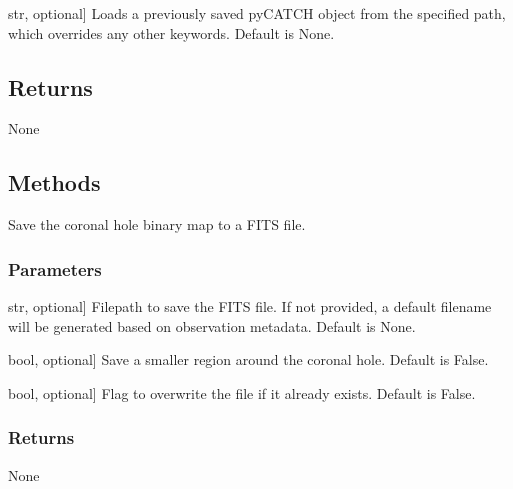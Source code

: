 \documentclass[letterpaper,10pt,english]{sphinxmanual}
\begin{document}
\begin{fulllineitems}
\begin{description}
\sphinxlineitem{load}{[}str, optional{]}
\sphinxAtStartPar
Loads a previously saved pyCATCH object from the specified path, which overrides any other keywords. Default is None.

\end{description}


\subsection{Returns}
\label{\detokenize{pycatch/pycatch:returns}}
\sphinxAtStartPar
None


\subsection{Methods}
\label{\detokenize{pycatch/pycatch:methods}}

\begin{fulllineitems}
\label{\detokenize{pycatch/pycatch:pycatch.pycatch.pycatch.bin2fits}}
\pysigstartsignatures
{}
\pysigstopsignatures
\sphinxAtStartPar
Save the coronal hole binary map to a FITS file.


\subsubsection{Parameters}
\label{\detokenize{pycatch/pycatch:id1}}\begin{description}
\sphinxlineitem{file}{[}str, optional{]}
\sphinxAtStartPar
Filepath to save the FITS file. If not provided, a default filename will be generated based on observation metadata. Default is None.

\sphinxlineitem{small}{[}bool, optional{]}
\sphinxAtStartPar
Save a smaller region around the coronal hole. Default is False.

\sphinxlineitem{overwrite}{[}bool, optional{]}
\sphinxAtStartPar
Flag to overwrite the file if it already exists. Default is False.

\end{description}


\subsubsection{Returns}
\label{\detokenize{pycatch/pycatch:id2}}
\sphinxAtStartPar
None


\end{fulllineitems}
\end{fulllineitems}
\end{document}
